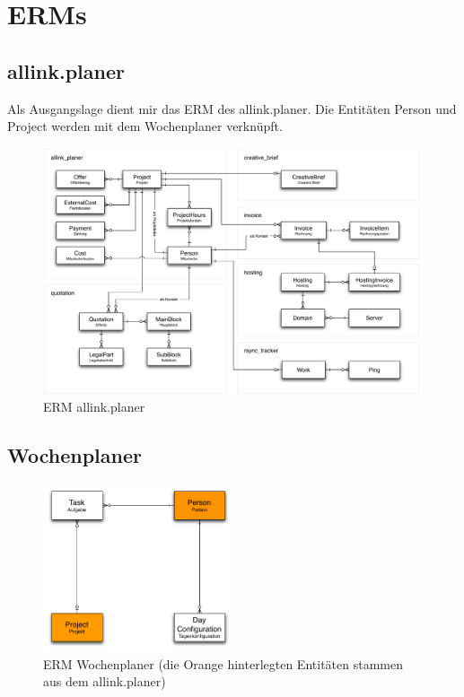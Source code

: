\section{ERMs}
\subsection{allink.planer}
Als Ausgangslage dient mir das ERM des allink.planer. Die Entitäten Person und Project werden mit dem Wochenplaner verknüpft.

\begin{figure}[!ht]
\begin{center}
\includegraphics[width=0.99\textwidth,angle=0]{./bilder/erm_planer.pdf}
\caption[ERM allink.planer]{ERM allink.planer\footnotemark}
\end{center}
\end{figure}

\clearpage

\subsection{Wochenplaner}
\begin{figure}[!ht]
\begin{center}
\includegraphics[width=0.5\textwidth,angle=0]{./bilder/erm.pdf}
\caption[ERM Wochenplaner]{ERM Wochenplaner (die Orange hinterlegten Entitäten stammen aus dem allink.planer)\footnotemark}
\end{center}
\end{figure}
\clearpage
